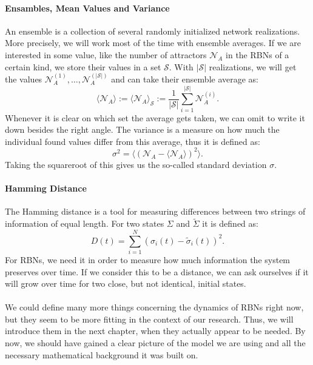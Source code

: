 \paragraph{Ensambles, Mean Values and Variance}
An ensemble is a collection of several randomly initialized network realizations. More precisely, we will work most of the time with ensemble averages. If we are interested in some value, like the number of attractors $ \mathcal{N}_A $ in the RBNs of a certain kind, we store their values in a set $\mathcal{S}$. With $|\mathcal{S}|$ realizations, we will get the values $\mathcal{N}_A^{(1)},\dots,\mathcal{N}_A^{(|\mathcal{S}|)}$ and can take their ensemble average as:
\begin{equation}
\langle \mathcal{N}_A \rangle := \langle \mathcal{N}_A \rangle_\mathcal{S} := \frac{1}{|\mathcal{S}|} \sum\limits_{i=1}^{|\mathcal{S}|} \mathcal{N}_A^{(i)}.
\end{equation}
Whenever it is clear on which set the average gets taken, we can omit to write it down besides the right angle. The variance is a measure on how much the individual found values differ from this average, thus it is defined as:
\begin{equation}
\sigma^2 = \langle (\mathcal{N}_A-\langle \mathcal{N}_A \rangle)^2 \rangle.
\end{equation}
Taking the squareroot of this gives us the so-called standard deviation $ \sigma $.

\paragraph*{Hamming Distance}
The Hamming distance is a tool for measuring differences between two strings of information of equal length. For two states $ \Sigma $ and $ \tilde{\Sigma} $ it is defined as:
\begin{equation}\label{eq:hamming_distance}
D(t) = \sum\limits_{i = 1}^N \left( \sigma_i(t) - \tilde{\sigma}_i(t) \right)^2.
\end{equation}
For RBNs, we need it in order to measure how much information the system preserves over time. If we consider this to be a distance, we can ask ourselves if it will grow over time for two close, but not identical, initial states.

\paragraph*{}
We could define many more things concerning the dynamics of RBNs right now, but they seem to be more fitting in the context of our research. Thus, we will introduce them in the next chapter, when they actually appear to be needed. By now, we should have gained a clear picture of the model we are using and all the necessary mathematical background it was built on.

